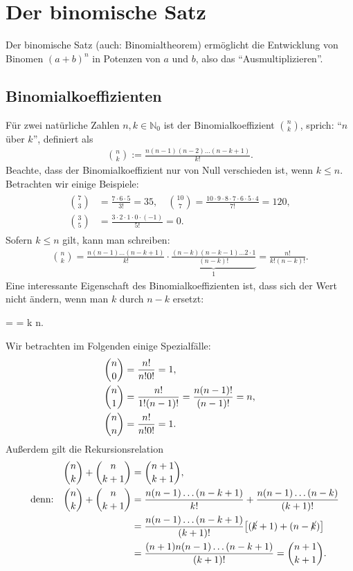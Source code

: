 \section{Der binomische Satz}

Der binomische Satz (auch: Binomialtheorem) ermöglicht die Entwicklung von Binomen $(a+b)^n$ in Potenzen von $a$ und $b$, also das ``Ausmultiplizieren''. 

\subsection{Binomialkoeffizienten}
Für zwei natürliche Zahlen $n,k \in \mathbb{N}_0$ ist der Binomialkoeffizient $\binom{n}{k}$, sprich: ``$n$ über $k$'', definiert als 
\begin{align}
    \binom{n}{k} := \frac{n(n-1)(n-2)\hdots (n-k+1)}{k!}.
\end{align}
Beachte, dass der Binomialkoeffizient nur von Null verschieden ist, wenn $k \le n$. Betrachten wir einige Beispiele: 
\begin{align}
    \begin{split}
        \binom{7}{3} &= \frac{7\cdot 6\cdot 5}{3!} = 35, \quad \binom{10}{7} = \frac{10\cdot 9 \cdot 8 \cdot 7 \cdot 6 \cdot 5 \cdot 4}{7!} = 120, \\
        \binom{3}{5} &= \frac{3 \cdot 2 \cdot 1 \cdot 0 \cdot (-1)}{5!} = 0.
    \end{split}
\end{align}
Sofern $k \le n$ gilt, kann man schreiben: 
\begin{align}
    \binom{n}{k} = \frac{n(n-1)\hdots (n-k+1)}{k!} \cdot \underbrace{\frac{(n-k)(n-k-1)\hdots 2 \cdot 1}{(n-k)!}}_{1} = \frac{n!}{k!(n-k)!}.
\end{align}
Eine interessante Eigenschaft des Binomialkoeffizienten ist, dass sich der Wert nicht ändern, wenn man $k$ durch $n-k$ ersetzt:
\begin{mymathbox}[ams align, title={Binomialkoeffizent}, colframe={FSUblau}]
 =  \qq{,}  =   k \le n.
\end{mymathbox}

Wir betrachten im Folgenden einige Spezialfälle: 
\begin{align}
    \binom{n}{0} &= \frac{n!}{n! 0!} = 1, \notag \\
    \binom{n}{1} &= \frac{n!}{1!(n-1)!} = \frac{n(n-1)!}{(n-1)!} =n, \\
    \binom{n}{n} &= \frac{n!}{n! 0!} = 1. \notag
\end{align}
Außerdem gilt die Rekursionsrelation 
\begin{align}
    \binom{n}{k} + \binom{n}{k+1} &= \binom{n+1}{k+1}, \\
    \qq{denn:} \binom{n}{k} + \binom{n}{k+1} &= \frac{n(n-1)\hdots (n-k+1)}{k!} + \frac{n(n-1)\hdots (n-k)}{(k+1)!} \notag \\
    &= \frac{n(n-1)\hdots (n-k+1)}{(k+1)!} \qty[(\cancel{k}+1)+(n-\cancel{k})] \notag \\
    &= \frac{(n+1)n(n-1) \hdots (n-k+1)}{(k+1)!} = \binom{n+1}{k+1}.
\end{align}

